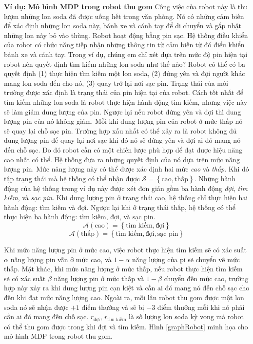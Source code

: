 	\textbf{Ví dụ: Mô hình MDP trong robot thu gom} Công việc của robot này là thu lượm những lon soda đã được uống hết trong văn phòng. Nó có những cảm biến để xác định những lon soda này, bánh xe và cánh tay để di chuyển và gắp nhặt những lon này bỏ vào thùng. Robot hoạt động bằng pin sạc. Hệ thống điều khiển của robot có chức năng tiếp nhận những thông tin từ cảm biến từ đó điểu khiển bánh xe và cánh tay. Trong ví dụ, chúng em chỉ xét dựa trên mức độ pin hiện tại robot nên quyết định tìm kiếm những lon soda như thế nào? Robot có thể có ba quyết định (1) thực hiện tìm kiếm một lon soda, (2) đứng yên và đợi người khác mang lon soda đến cho nó, (3) quay trở lại nơi sạc pin. Trạng thái của môi trường được xác định là trạng thái của pin hiện tại của robot. Cách tốt nhất để tìm kiếm những lon soda là robot thực hiện hành động tìm kiếm, nhưng việc này sẽ làm giảm dung lượng của pin. Ngược lại nếu robot đứng yên và đợi thì dung lượng pin của nó không giảm. Mỗi khi dung lượng pin của robot ở mức thấp nó sẽ quay lại chỗ sạc pin. Trường hợp xấu nhất có thể xảy ra là robot không đủ dung lượng pin để quay lại nơi sạc khi đó nó sẽ đứng yên và đợi ai đó mang nó đến chỗ sạc. Do đó robot cần có một chiến lược phù hợp để đạt được hiệu năng cao nhất có thể.
	Hệ thống đưa ra những quyết định của nó dựa trên mức năng lượng pin. Mức năng lượng này có thể được xác định hai mức \textit{cao} và \textit{thấp}. Khi đó tập trạng thái mà hệ thống có thể nhận được $\mathcal{S} = \left \{\text{cao}, \text{thấp} \right \}$. Những hành động của hệ thống trong ví dụ này được xét đơn giản gồm ba hành động \textit{đợi}, \textit{tìm kiếm}, và \textit{sạc pin}. Khi dung lượng pin ở trạng thái cao, hệ thống chỉ thực hiện hai hành động: tìm kiếm và đợi. Ngược lại khi ở trạng thái thấp, hệ thống có thể thực hiện ba hành động: tìm kiếm, đợi, và sạc pin.
		$$\mathcal{A}(\text{cao}) =  \left \{\text{tìm kiếm}, \text{đợi} \right \}$$
		$$\mathcal{A}(\text{thấp}) =  \left \{\text{tìm kiếm}, \text{đợi}, \text{sạc pin} \right \}$$
	
	Khi mức năng lượng pin ở mức cao, việc robot thực hiện tìm kiếm sẽ có xác suất $\alpha$ năng lượng pin vẫn ở mức cao, và $1 - \alpha$ năng lượng của pi sẽ chuyển về mức thấp. Mặt khác, khi mức năng lượng ở mức thấp, nếu robot thực hiện tìm kiếm sẽ có xác suất $\beta$ năng lượng pin ở mức thấp và $1 - \beta$ chuyển đến mức cao, trường hợp này xảy ra khi dung lượng pin cạn kiệt và cần ai đó mang nó đến chỗ sạc cho đến khi đạt mức năng lượng cao. Ngoài ra, mỗi lần robot thu gom được một lon soda nó sẽ nhận được $+1$ điểm thưởng và sẽ bị $-3$ điểm thưởng mỗi khi nó phải cần ai đó mang đến chỗ sạc. $r_{\text{đợi}}$, $r_{\text{tìm kiếm}}$ là số lượng lon soda kỳ vọng mà robot có thể thu gom được trong khi đợi và tìm kiếm. Hình \ref{graphRobot} minh họa cho mô hình MDP trong robot thu gom.
	
